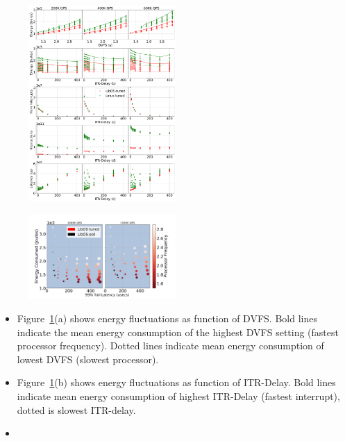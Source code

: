 \begin{figure}
\includegraphics[width=0.5\textwidth]{figures/mcd_detail_1}
\caption[]{}
\label{fig:mcd_detail_1}
\end{figure}

\begin{figure}
\includegraphics[width=0.5\textwidth]{figures/mcd_overview2}
\caption[]{}
\label{fig:mcd_overview2}
\end{figure}


\begin{itemize}
    \item Figure~\ref{fig:mcd_detail_1}(a) shows energy fluctuations as function of DVFS. Bold lines indicate the mean energy consumption of the highest DVFS setting (fastest processor frequency). Dotted lines indicate mean energy consumption of lowest DVFS (slowest processor).
    \item Figure~\ref{fig:mcd_detail_1}(b)  shows energy fluctuations as function of ITR-Delay. Bold lines indicate mean energy consumption of highest ITR-Delay (fastest interrupt), dotted is slowest ITR-delay.
    \item 
\end{itemize}